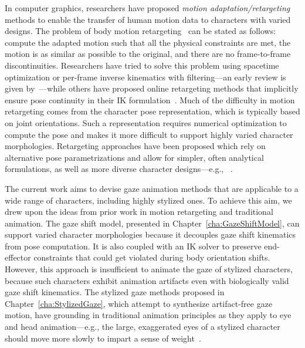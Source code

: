 In computer graphics, researchers have proposed \emph{motion adaptation/retargeting} methods to enable the transfer of human motion data to characters with varied designs. The problem of body motion retargeting~\citep{gleicher1998retargetting} can be stated as follows: compute the adapted motion such that all the physical constraints are met, the motion is as similar as possible to the original, and there are no frame-to-frame discontinuities. Researchers have tried to solve this problem using spacetime optimization or per-frame inverse kinematics with filtering---an early review is given by~\citet{gleicher2001comparing}---while others have proposed online retargeting methods that implicitly ensure pose continuity in their IK formulation~\citep{shin2001puppetry}. Much of the difficulty in motion retargeting comes from the character pose representation, which is typically based on joint orientations. Such a representation requires numerical optimization to compute the pose and makes it more difficult to support highly varied character morphologies. Retargeting approaches have been proposed which rely on alternative pose parametrizations and allow for simpler, often analytical formulations, as well as more diverse character designs---e.g., ~\citep{multon2008mkm,hecker2008real,ho2010spatial}.

The current work aims to devise gaze animation methods that are applicable to a wide range of characters, including highly stylized ones. To achieve this aim, we drew upon the ideas from prior work in motion retargeting and traditional animation. The gaze shift model, presented in Chapter~\ref{cha:GazeShiftModel}, can support varied character morphologies because it decouples gaze shift kinematics from pose computation. It is also coupled with an IK solver to preserve end-effector constraints that could get violated during body orientation shifts. However, this approach is insufficient to animate the gaze of stylized characters, because such characters exhibit animation artifacts even with biologically valid gaze shift kinematics. The stylized gaze methods proposed in Chapter~\ref{cha:StylizedGaze}, which attempt to synthesize artifact-free gaze motion, have grounding in traditional animation principles as they apply to eye and head animation---e.g., the large, exaggerated eyes of a stylized character should move more slowly to impart a sense of weight~\citep{williams2009animator}.